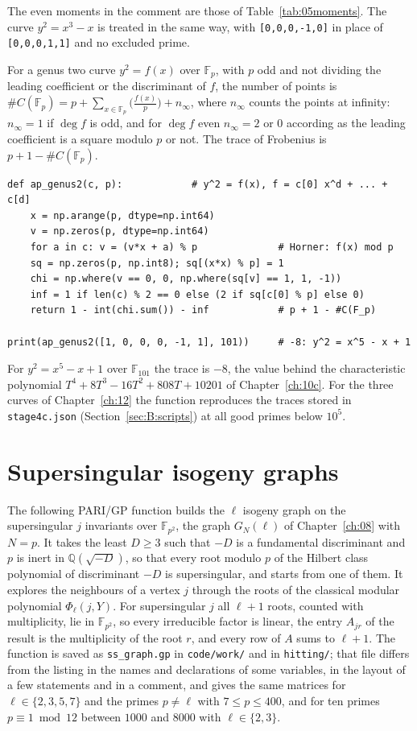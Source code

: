 The even moments in the comment are those of Table~\ref{tab:05moments}. The curve $y^2=x^3-x$ is treated in the same way, with \texttt{[0,0,0,-1,0]} in place of \texttt{[0,0,0,1,1]} and no excluded prime.

For a genus two curve $y^2=f(x)$ over $\mathbb F_p$, with $p$ odd and not dividing the leading coefficient or the discriminant of $f$, the number of points is $\#C(\mathbb F_p)=p+\sum_{x\in\mathbb F_p}\bigl(\tfrac{f(x)}{p}\bigr)+n_\infty$, where $n_\infty$ counts the points at infinity: $n_\infty=1$ if $\deg f$ is odd, and for $\deg f$ even $n_\infty=2$ or $0$ according as the leading coefficient is a square modulo $p$ or not. The trace of Frobenius is $p+1-\#C(\mathbb F_p)$.

{\footnotesize
\begin{verbatim}
def ap_genus2(c, p):            # y^2 = f(x), f = c[0] x^d + ... + c[d]
    x = np.arange(p, dtype=np.int64)
    v = np.zeros(p, dtype=np.int64)
    for a in c: v = (v*x + a) % p              # Horner: f(x) mod p
    sq = np.zeros(p, np.int8); sq[(x*x) % p] = 1
    chi = np.where(v == 0, 0, np.where(sq[v] == 1, 1, -1))
    inf = 1 if len(c) % 2 == 0 else (2 if sq[c[0] % p] else 0)
    return 1 - int(chi.sum()) - inf            # p + 1 - #C(F_p)

print(ap_genus2([1, 0, 0, 0, -1, 1], 101))     # -8: y^2 = x^5 - x + 1
\end{verbatim}
}

For $y^2=x^5-x+1$ over $\mathbb F_{101}$ the trace is $-8$, the value behind the characteristic polynomial $T^4+8T^3-16T^2+808T+10201$ of Chapter~\ref{ch:10c}. For the three curves of Chapter~\ref{ch:12} the function reproduces the traces stored in \texttt{stage4c.json} (Section~\ref{sec:B:scripts}) at all good primes below $10^5$.

\section{Supersingular isogeny graphs}\label{sec:B:ssgraph}

The following PARI/GP function builds the $\ell$ isogeny graph on the supersingular $j$ invariants over $\mathbb F_{p^2}$, the graph $G_N(\ell)$ of Chapter~\ref{ch:08} with $N=p$. It takes the least $D\ge3$ such that $-D$ is a fundamental discriminant and $p$ is inert in $\mathbb Q(\sqrt{-D})$, so that every root modulo $p$ of the Hilbert class polynomial of discriminant $-D$ is supersingular, and starts from one of them. It explores the neighbours of a vertex $j$ through the roots of the classical modular polynomial $\Phi_\ell(j,Y)$. For supersingular $j$ all $\ell+1$ roots, counted with multiplicity, lie in $\mathbb F_{p^2}$, so every irreducible factor is linear, the entry $A_{jr}$ of the result is the multiplicity of the root $r$, and every row of $A$ sums to $\ell+1$. The function is saved as \texttt{ss\_graph.gp} in \texttt{code/work/} and in \texttt{hitting/}; that file differs from the listing in the names and declarations of some variables, in the layout of a few statements and in a comment, and gives the same matrices for $\ell\in\{2,3,5,7\}$ and the primes $p\ne\ell$ with $7\le p\le400$, and for ten primes $p\equiv1\bmod12$ between $1000$ and $8000$ with $\ell\in\{2,3\}$.

